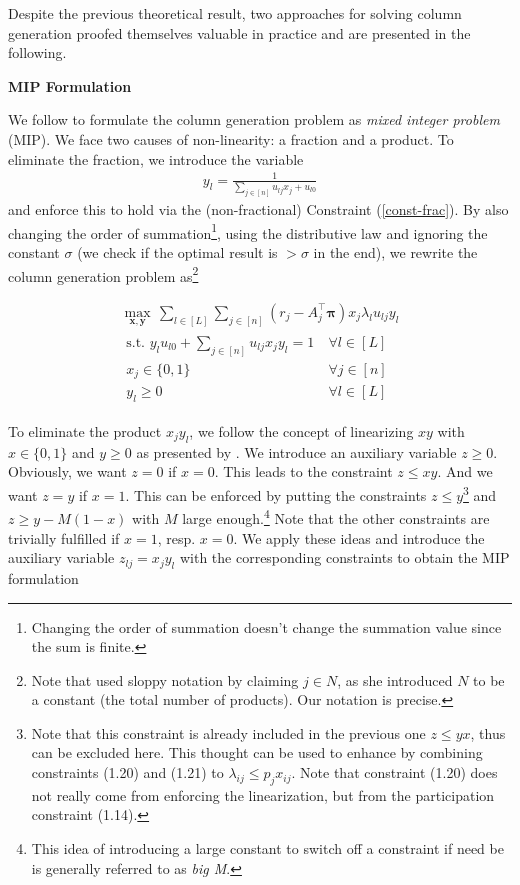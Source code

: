 Despite the previous theoretical result, two approaches for solving column generation proofed themselves valuable in practice and are presented in the following.

\bigskip
\textbf{MIP Formulation}

We follow \cite{Bront.2009} to formulate the column generation problem  as \emph{mixed integer problem} (MIP). We face two causes of non-linearity: a fraction and a product. To eliminate the fraction, we introduce the variable
\begin{align}
	y_l = \frac{1}{\sum_{j \in [n]} u_{lj}x_j + u_{l0}}
\end{align}
and enforce this to hold via the (non-fractional) Constraint (\ref{const-frac}). By also changing the order of summation\footnote{Changing the order of summation doesn't change the summation value since the sum is finite.}, using the distributive law and ignoring the constant $\sigma$ (we check if the optimal result is $> \sigma$ in the end), we rewrite the column generation problem  as\footnote{Note that \cite{Bront.2009} used sloppy notation by claiming $j\in N$, as she introduced $N$ to be a constant (the total number of products). Our notation is precise.}

\begin{gather}
	\max_{\boldsymbol{x}, \boldsymbol{y}}\, \sum_{l \in [L]}\sum_{j \in [n]} (r_j - A_j^\intercal\boldsymbol{\pi}) x_j \lambda_l u_{lj} y_l\\
	\begin{align}
	\text{s.t. }y_l u_{l0} + \sum_{j \in [n]} u_{lj} x_j y_l = 1 &~\forall l \in [L]\label{const-frac} \\
	x_j \in \{0, 1\} &~\forall j \in [n]\\
	y_l \geq 0 &~\forall l \in [L]
	\end{align}
\end{gather}

To eliminate the product $x_j y_l$, we follow the concept of linearizing $x y$ with $x\in \{0, 1\}$ and $y \geq 0$ as presented by \cite{Klein.2017}. We introduce an auxiliary variable $z \geq 0$. Obviously, we want $z = 0$ if $x=0$. This leads to the constraint $z \leq x y$. And we want $z = y$ if $x=1$. This can be enforced by putting the constraints $z \leq y$\footnote{Note that this constraint is already included in the previous one $z \leq y x$, thus can be excluded here. This thought can be used to enhance \cite{Klein.2017} by combining constraints (1.20) and (1.21) to $\lambda_{ij} \leq p_j x_{ij}$. Note that constraint (1.20) does not really come from enforcing the linearization, but from the participation constraint (1.14).} and $z \geq y - M(1-x)$ with $M$ large enough.\footnote{This idea of introducing a large constant to switch off a constraint if need be is generally referred to as \emph{big M}.} Note that the other constraints are trivially fulfilled if $x=1$, resp. $x=0$. We apply these ideas and introduce the auxiliary variable $z_{lj} = x_j y_l$ with the corresponding constraints to obtain the MIP formulation


